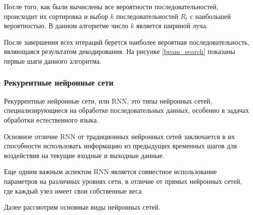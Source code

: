 После того, как были вычислены все вероятности последовательностей, происходит их сортировка и выбор $k$ последовательностей $R_t$ с наибольшей вероятностью. В данном алгоритме число $k$ является шириной луча.

После завершения всех итераций берется наиболее вероятная последовательность, являющаяся результатом декодирования. На рисунке \ref{beam_search} показаны первые шаги данного алгоритма.


\subsubsection{Рекурентные нейронные сети}

Рекуррентные нейронные сети, или RNN, это типы нейронных сетей, специализирующиеся на обработке последовательных данных, особенно в задачах обработки естественного языка.

Основное отличие RNN от традиционных нейронных сетей заключается в их способности использовать информацию из предыдущих временных шагов для воздействия на текущие входные и выходные данные.

Еще одним важным аспектом RNN является совместное использование параметров на различных уровнях сети, в отличие от прямых нейронных сетей, где каждый узел имеет свои собственные веса.

Далее рассмотрим основные виды нейронных сетей.

